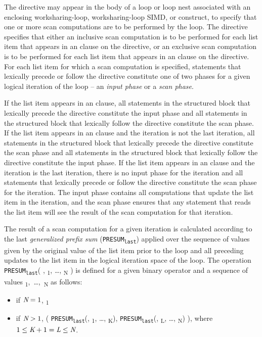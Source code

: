 \descr
The  directive may appear in the body of a loop or loop nest
associated with an enclosing worksharing-loop, worksharing-loop SIMD, or  construct, to
specify that one or more scan computations are to be performed by the loop.
The directive specifies that either an inclusive scan computation is to be performed
for each list item that appears in an  clause on the
directive, or an exclusive scan computation is to be performed for each list item that
appears in an  clause on the directive.  For each list item
for which a scan computation is specified, statements that lexically precede
or follow the directive constitute one of two phases for a given logical
iteration of the loop -- an \textit{input phase} or a \textit{scan phase}. 

If the list item appears in an  clause, all statements in the
structured block that lexically precede the directive constitute the input
phase and all statements in the structured block that lexically follow the
directive constitute the scan phase. If the list item appears in an
 clause and the iteration is not the last iteration, all
statements in the structured block that lexically precede the directive
constitute the scan phase and all statements in the structured block that
lexically follow the directive constitute the input phase. If the list item
appears in an  clause and the iteration is the last iteration,
there is no input phase for the iteration and all statements that lexically
precede or follow the directive constitute the scan phase for the iteration.
The input phase contains all computations that update the list item in the
iteration, and the scan phase ensures that any statement that reads the list
item will see the result of the scan computation for that iteration.

The result of a scan computation for a given iteration is calculated according
to the last \textit{generalized prefix sum}
(\texttt{PRESUM\textsubscript{last}}) applied over the sequence of values
given by the original value of the list item prior to the loop and all
preceding updates to the list
item in the logical iteration space of the loop. The operation
\texttt{PRESUM\textsubscript{last}}(
, \textsubscript{1}, \ldots, \textsubscript{N} ) is
defined for a given binary operator  and a sequence of  values
\mbox{\textsubscript{1}, \ldots, \textsubscript{N}} as follows:

\begin{itemize}

\item if $\plc{N} = 1$, \textsubscript{1}

\item if $\plc{N} > 1$, (
    \texttt{PRESUM\textsubscript{last}}(, \textsubscript{1},
    \ldots, \textsubscript{K}), \texttt{PRESUM\textsubscript{last}}(, \textsubscript{L}, \ldots, \textsubscript{N}) ), where $1 \leq \plc{K}+1 = \plc{L} \leq \plc{N}$.
\end{itemize}

